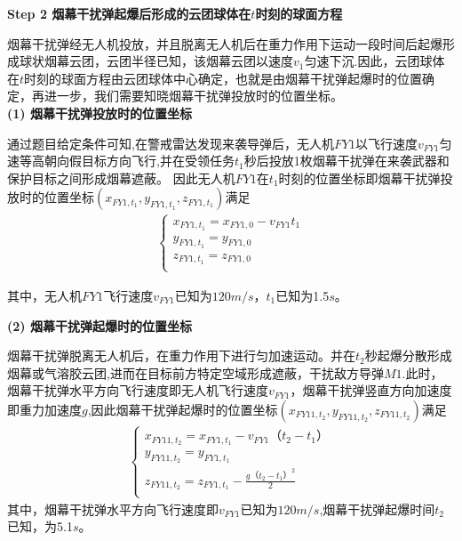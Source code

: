 \documentclass[../main.tex]{subfiles}
\begin{document}
\noindent\textbf{Step 2 烟幕干扰弹起爆后形成的云团球体在$t$时刻的球面方程}
\par 烟幕干扰弹经无人机投放，并且脱离无人机后在重力作用下运动一段时间后起爆形成球状烟幕云团，云团半径已知，该烟幕云团以速度$v_1$匀速下沉.因此，云团球体在$t$时刻的球面方程由云团球体中心确定，也就是由烟幕干扰弹起爆时的位置确定，再进一步，我们需要知晓烟幕干扰弹投放时的位置坐标。
\\
\noindent \textbf{(1) 烟幕干扰弹投放时的位置坐标}
\par 通过题目给定条件可知,在警戒雷达发现来袭导弹后，无人机\( FY1 \)以飞行速度\( v_{FY1} \)匀速等高朝向假目标方向飞行,并在受领任务$t_1$秒后投放1枚烟幕干扰弹在来袭武器和保护目标之间形成烟幕遮蔽。
因此无人机$FY1$在$t_1$时刻的位置坐标即烟幕干扰弹投放时的位置坐标$(x_{FY1,t_1}, y_{FY1,{t_1}}, z_{FY1,{t_1}})$满足
\begin{align}\label{1.8}
\left\{ \begin{array}{l}
x_{FY1,{t_1}}=x_{FY1,0}-v_{FY1}{t_1}\\
y_{FY1,{t_1}}=y_{FY1,0}\\
z_{FY1,{t_1}}=z_{FY1,0}\\
\end{array} \right. 
\end{align}
\par 其中，无人机$FY1$飞行速度\( v_{FY1} \)已知为$120m/s$，$t_1$已知为1.5$s$。


\noindent\textbf{(2) 烟幕干扰弹起爆时的位置坐标}
\par 烟幕干扰弹脱离无人机后，在重力作用下进行匀加速运动。并在$t_2$秒起爆分散形成烟幕或气溶胶云团,进而在目标前方特定空域形成遮蔽，干扰敌方导弹$M1$.此时，烟幕干扰弹水平方向飞行速度即无人机飞行速度\( v_{FY1} \)，烟幕干扰弹竖直方向加速度即重力加速度$g$,因此烟幕干扰弹起爆时的位置坐标$\left( x_{FY11,t_2},y_{FY11,t_2},z_{FY11,t_2} \right)$满足
\begin{align}\label{1.9}
\left\{ \begin{array}{l}
	x_{FY11,{t_2}}=x_{FY1,t_1}-v_{FY1}\text{（}t_2-t_1\text{）}\\
	y_{FY11,{t_2}}=y_{FY1,t_1}\\
	z_{FY11,{t_2}}=z_{FY1,t_1}-\frac{g\text{（}t_2-t_1\text{）}^2}{2}\\
\end{array} \right. 
\end{align}
其中，烟幕干扰弹水平方向飞行速度即\( v_{FY1} \)已知为$120m/s$,烟幕干扰弹起爆时间$t_2$已知，为5.1$s$。
\end{document}
